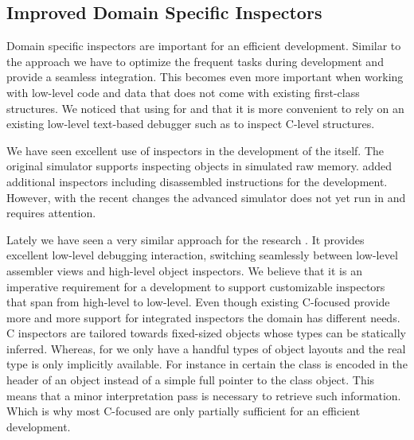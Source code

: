 \subsection{Improved Domain Specific Inspectors}
Domain specific inspectors are important for an efficient development.
Similar to the \JIT approach we have to optimize the frequent tasks during development and provide a seamless integration.
This becomes even more important when working with low-level code and data that does not come with existing first-class structures.
We noticed that using \B for \NBJ and \WF that it is more convenient to rely on an existing low-level text-based debugger such as  to inspect C-level structures.

We have seen excellent use of inspectors in the \VM development of the \Cog \VM itself.
The original simulator supports inspecting objects in simulated raw memory.
\Cog added additional inspectors including disassembled instructions for the \JIT development.
However, with the recent changes the advanced simulator does not yet run in \PH and requires attention.

Lately we have seen a very similar approach for the \Maxine research \VM \cite{Wimm13a}.
It provides excellent low-level debugging interaction, switching seamlessly between low-level assembler views and high-level object inspectors.
We believe that it is an imperative requirement for a \VM development \IDE to support customizable inspectors that span from high-level to low-level.
Even though existing C-focused \IDEs provide more and more support for integrated inspectors the \VM domain has different needs.
C inspectors are tailored towards fixed-sized objects whose types can be statically inferred.
Whereas, for \VMs we only have a handful types of object layouts and the real type is only implicitly available.
For instance in certain \VMs the class is encoded in the header of an object instead of a simple full pointer to the class object.
This means that a minor interpretation pass is necessary to retrieve such information.
Which is why most C-focused \IDEs are only partially sufficient for an efficient \VM development.


